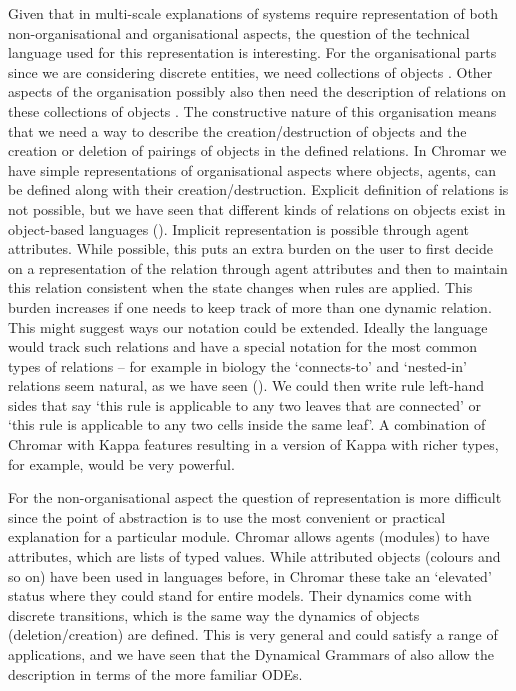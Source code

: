 Given that in multi-scale explanations of systems require representation of both
non-organisational and organisational aspects, the question of the technical
language used for this representation is interesting. For the organisational
parts since we are considering discrete entities, we need collections of objects
\citep{fontana_barrier_1996}. Other aspects of the organisation possibly also
then need the description of relations on these collections of objects
\citep{rashevsky_topology_1954, rosen_relational_1958}. The constructive nature
of this organisation means that we need a way to describe the
creation/destruction of objects and the creation or deletion of pairings of
objects in the defined relations. In Chromar we have simple representations of
organisational aspects where objects, agents, can be defined along with their
creation/destruction. Explicit definition of relations is not possible, but we
have seen that different kinds of relations on objects exist in object-based
languages (). Implicit representation is possible through agent
attributes. While possible, this puts an extra burden on the user to first
decide on a representation of the relation through agent attributes and then to
maintain this relation consistent when the state changes when rules are
applied. This burden increases if one needs to keep track of more than one
dynamic relation. This might suggest ways our notation could be
extended. Ideally the language would track such relations and have a special
notation for the most common types of relations -- for example in biology the
`connects-to' and `nested-in' relations seem natural, as we have seen
(). We could then write rule left-hand sides that say `this
rule is applicable to any two leaves that are connected' or `this rule is
applicable to any two cells inside the same leaf'. A combination of Chromar with
Kappa features resulting in a version of Kappa with richer types, for example,
would be very powerful.

For the non-organisational aspect the question of representation is more
difficult since the point of abstraction is to use the most convenient or
practical explanation for a particular module. Chromar allows agents (modules)
to have attributes, which are lists of typed values. While attributed objects
(colours and so on) have been used in languages before, in Chromar these take an
`elevated' status where they could stand for entire models. Their dynamics come with
discrete transitions, which is the same way the dynamics of objects
(deletion/creation) are defined. This is very general and could satisfy a range
of applications, and we have seen that the Dynamical Grammars of
\citet{mjolsness2006stochastic} also allow the description in terms of the more
familiar ODEs. 

